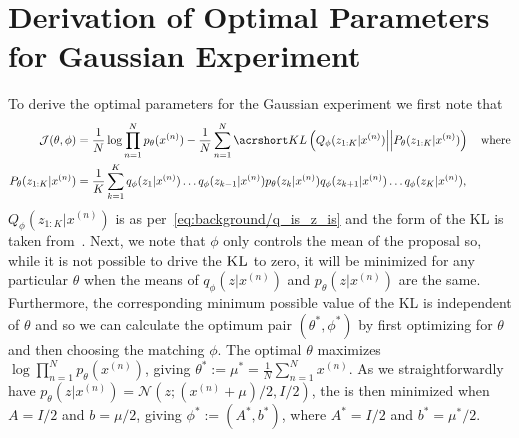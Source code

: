 
\vspace{-4pt}

\section{Derivation of Optimal Parameters for Gaussian Experiment}
\label{sec:optGauss}

\vspace{-4pt}

To derive the optimal parameters for the Gaussian experiment we first note that
\begin{align*}
\mathcal J(\theta, \phi) %
&= \frac{1}{N}\log \prod_{n=1}^{N} p_{\theta}(x^{(n)}) - \frac{1}{N}\sum_{n=1}^{N} \KL{Q_{\phi}(z_{1:K}|x^{(n)})}{P_{\theta}(z_{1:K}|x^{(n)})} \quad \text{where}\\
P_{\theta}(z_{1:K}|x^{(n)}) &= \frac{1}{K} \sum_{k=1}^{K}
q_{\phi} (z_1 | x^{(n)}) \dots q_{\phi} (z_{k-1} | x^{(n)}) p_{\theta} (z_k | x^{(n)}) 
q_{\phi} (z_{k+1} | x^{(n)}) \dots q_{\phi} (z_{K} | x^{(n)}),
\end{align*}
$Q_{\phi}(z_{1:K}|x^{(n)})$ is as per~\eqref{eq:background/q_is_z_is} 
 and the form of the \gls{KL} is taken from~\cite{Le2017auto}.
Next, we note that $\phi$ only controls the mean of the proposal so, while it is not possible to drive the
$\textsc{KL}$ to zero, it will be minimized for any particular $\theta$ when the means of $q_{\phi}(z|x^{(n)})$
and $p_{\theta}(z|x^{(n)})$ are the same.  
Furthermore, the corresponding minimum possible value of the \textsc{KL} is independent of
$\theta$ and so we can
calculate the optimum pair $(\theta^*,\phi^*)$ by first optimizing for $\theta$ and then choosing the matching $\phi$.
The optimal $\theta$ maximizes $\log \prod_{n=1}^{N} p_{\theta}(x^{(n)})$, giving $\theta^* := \mu^* = \frac{1}{N} \sum_{n = 1}^N x^{(n)}$.
As we straightforwardly have $p_{\theta} (z | x^{(n)}) = 
\mathcal{N}(z; \left(x^{(n)}+\mu\right)/2, I/2)$, the  is then minimized
when $A=I/2$ and $b=\mu/2$, giving $\phi^* := (A^*, b^*)$, where $A^* = I / 2$ and $b^* = \mu^* / 2$.

\vspace{-4pt}